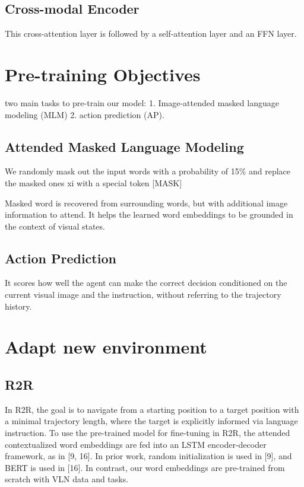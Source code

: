 \documentclass{article}
\begin{document}
\subsection{Cross-modal Encoder}
This cross-attention layer is followed by a self-attention layer and an FFN layer.

\section{Pre-training Objectives}
two main tasks to pre-train our model:
1. Image-attended masked language modeling (MLM) 
2. action prediction (AP). 

\subsection{Attended Masked Language Modeling}
We randomly mask out the input words with a probability of 15\% and replace
the masked ones xi with a special token [MASK]

Masked word is recovered from surrounding words, but with
additional image information to attend. It helps the learned
word embeddings to be grounded in the context of visual
states.

\subsection{Action Prediction}
It scores how well the agent can make the correct decision conditioned on the current visual image and the instruction, without referring to the trajectory history.

\section{Adapt new environment}
\subsection{R2R}
In R2R, the goal is to navigate from a starting position to
a target position with a minimal trajectory length, where
the target is explicitly informed via language instruction.
To use the pre-trained model for fine-tuning in R2R, the
attended contextualized word embeddings are fed into an
LSTM encoder-decoder framework, as in [9, 16]. In prior
work, random initialization is used in [9], and BERT is used
in [16]. In contrast, our word embeddings are pre-trained
from scratch with VLN data and tasks.

\medskip

\printglossary


\printbibliography
\end{document}

